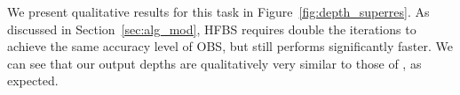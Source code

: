 We present qualitative results for this task in Figure~\ref{fig:depth_superres}.
As discussed in Section~\ref{sec:alg_mod}, HFBS requires double the iterations to achieve the same accuracy level of OBS, but still performs significantly faster.
We can see that our output depths are qualitatively very similar to those of
\cite{BarronPoole2016}, as expected.
